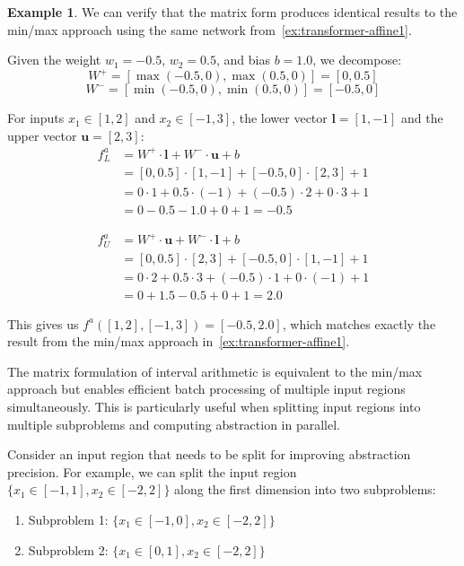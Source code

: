 \documentclass[oneside,11pt,dvipsnames]{book}
\numberwithin{equation}{section}
\theoremstyle{definition}
\newtheorem{example}{Example}[section]
\theoremstyle{remark}
\begin{document}
\begin{example}\label{ex:matrix-form-equivalence}
    We can verify that the matrix form produces identical results to the min/max approach using the same network from~\autoref{ex:transformer-affine1}.

    Given the weight $w_1 = -0.5$, $w_2 = 0.5$, and bias $b = 1.0$, we decompose:
    \[
    W^+ = [\max(-0.5, 0), \max(0.5, 0)] = [0, 0.5]
    \]
    \[
    W^- = [\min(-0.5, 0), \min(0.5, 0)] = [-0.5, 0]
    \]

    For inputs $x_1 \in [1, 2]$ and $x_2 \in [-1, 3]$, the lower vector $\mathbf{l} = [1, -1]$ and the upper vector $\mathbf{u} = [2, 3]$:
    \[
    \begin{aligned}
    f^a_L &= W^+ \cdot \mathbf{l} + W^- \cdot \mathbf{u} + b\\
    &= [0, 0.5] \cdot [1, -1] + [-0.5, 0] \cdot [2, 3] + 1\\
    &= 0 \cdot 1 + 0.5 \cdot (-1) + (-0.5) \cdot 2 + 0 \cdot 3 + 1\\
    &= 0 - 0.5 - 1.0 + 0 + 1 = -0.5
    \end{aligned}
    \]

    \[
    \begin{aligned}
    f^a_U &= W^+ \cdot \mathbf{u} + W^- \cdot \mathbf{l} + b\\
    &= [0, 0.5] \cdot [2, 3] + [-0.5, 0] \cdot [1, -1] + 1\\
    &= 0 \cdot 2 + 0.5 \cdot 3 + (-0.5) \cdot 1 + 0 \cdot (-1) + 1\\
    &= 0 + 1.5 - 0.5 + 0 + 1 = 2.0
    \end{aligned}
    \]

    This gives us $f^a([1,2],[-1,3]) = [-0.5, 2.0]$, which matches exactly the result from the min/max approach in~\autoref{ex:transformer-affine1}.
    \end{example}


The matrix formulation of interval arithmetic is equivalent to the min/max approach but enables efficient batch processing of multiple input regions simultaneously.
This is particularly useful when splitting input regions into multiple subproblems and computing abstraction in parallel.

Consider an input region that needs to be split for improving abstraction precision.
For example, we can split the input region $\{x_1 \in [-1,1], x_2 \in [-2,2]\}$ along the first dimension into two subproblems:
\begin{enumerate}
\item Subproblem 1: $\{x_1 \in [-1,0], x_2 \in [-2,2]\}$
\item Subproblem 2: $\{x_1 \in [0,1], x_2 \in [-2,2]\}$
\end{enumerate}
\end{document}

